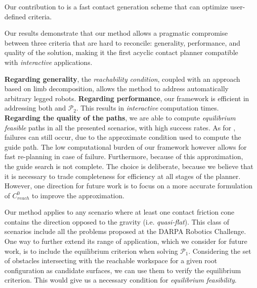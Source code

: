 \documentclass[journal]{IEEEtran}
\newcommand{\equilibriumfeasibility}[0]{\glslink{equilibrium feasible}{\textit{equilibrium feasibility}}}	%
\newcommand{\gls}[1]{\textit{#1}}
\newcommand{\glslink}[2]{{#2}}
\begin{document}
Our contribution to \Pb is a fast contact generation scheme that can optimize user-defined criteria.

Our results demonstrate that our method allows a pragmatic compromise between three 
criteria that are hard to reconcile: generality, performance, and quality of the solution, making it the first acyclic contact
planner compatible with \gls{interactive} applications.

%
\textbf{Regarding generality}, the \textit{reachability condition}, coupled with an approach based on limb decomposition, 
allows the method to address automatically arbitrary legged robots.
%
\textbf{Regarding performance}, our framework is efficient in addressing both \Pa and $\mathcal{P}_2$. This results in \gls{interactive} computation times.
%
\textbf{Regarding the quality of the paths}, we are able to compute
\gls{equilibrium feasible} paths in all the presented scenarios, with high success rates.
As for \cite{Bouyarmane2009}, failures can still occur, due to the approximate condition used to compute the guide path.
The low computational burden of our framework however allows for fast re-planning in case of failure.
Furthermore, because of this approximation, the guide search is not complete. The choice is deliberate, because we believe
that it is necessary to trade completeness for efficiency at all stages of the planner.
However, one direction for future work is to focus on a more accurate formulation of $C_{reach}^0$ to improve
the approximation.

Our method applies to any scenario where at least one contact friction cone contains
the direction opposed to the gravity (i.e. \textit{quasi-flat}). This class of scenarios include all the problems proposed at the DARPA Robotics Challenge.
One way to further extend its range of application, which we consider for future work, is to include the equilibrium criterion when solving $\mathcal{P}_1$.
Considering the set of obstacles intersecting with the reachable workspace for a given root configuration as candidate surfaces, we can use them to verify the equilibrium criterion.
This would give us a necessary condition for \equilibriumfeasibility. %
\end{document}
